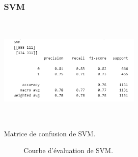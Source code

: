 \subsubsection*{SVM}
\begin{minipage}[t]{0.5\textwidth}
    \begin{table}[H]
        \centering
        \setlength{\fboxsep}{5pt}
        \setlength{\fboxrule}{0.5pt}
        \includegraphics[width=7cm,height=5.36cm]{images/SVM.png}
        \caption{Matrice de confusion de SVM.}
    \end{table}
\end{minipage}
\begin{minipage}[t]{0.5\textwidth}
    \begin{figure}[H]
        \centering
        \setlength{\fboxsep}{5pt}
        \setlength{\fboxrule}{0.5pt}
        \caption{Courbe d'évaluation de SVM.}
    \end{figure}
\end{minipage}

